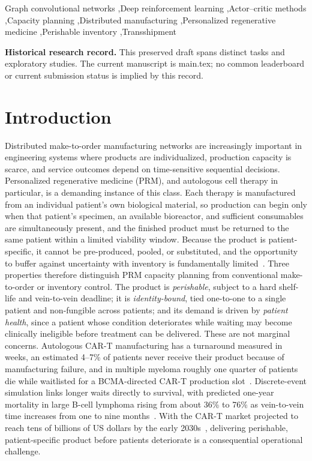 \documentclass[preprint,review,12pt]{elsarticle}
\begin{document}
\begin{frontmatter}
\begin{keyword}
Graph convolutional networks \sep Deep reinforcement learning \sep Actor--critic methods \sep Capacity planning \sep Distributed manufacturing \sep Personalized regenerative medicine \sep Perishable inventory \sep Transshipment
\end{keyword}

\end{frontmatter}
\linenumbers
\begin{center}
\textbf{Historical research record.} This preserved draft spans distinct tasks and
exploratory studies. The current manuscript is main.tex; no common leaderboard
or current submission status is implied by this record.
\end{center}


\section{Introduction}
\label{sec:introduction}

Distributed make-to-order manufacturing networks are increasingly important in engineering systems where products are individualized, production capacity is scarce, and service outcomes depend on time-sensitive sequential decisions. Personalized regenerative medicine (PRM), and autologous cell therapy in particular, is a demanding instance of this class. Each therapy is manufactured from an individual patient's own biological material, so production can begin only when that patient's specimen, an available bioreactor, and sufficient consumables are simultaneously present, and the finished product must be returned to the same patient within a limited viability window. Because the product is patient-specific, it cannot be pre-produced, pooled, or substituted, and the opportunity to buffer against uncertainty with inventory is fundamentally limited~\cite{Wang2023SimulationBased, Zheng2022HybridMBRL}. Three properties therefore distinguish PRM capacity planning from conventional make-to-order or inventory control. The product is \emph{perishable}, subject to a hard shelf-life and vein-to-vein deadline; it is \emph{identity-bound}, tied one-to-one to a single patient and non-fungible across patients; and its demand is driven by \emph{patient health}, since a patient whose condition deteriorates while waiting may become clinically ineligible before treatment can be delivered. These are not marginal concerns. Autologous CAR-T manufacturing has a turnaround measured in weeks, an estimated 4--7\% of patients never receive their product because of manufacturing failure, and in multiple myeloma roughly one quarter of patients die while waitlisted for a BCMA-directed CAR-T production slot~\cite{AyalaCeja2024CARTManufacturing}. Discrete-event simulation links longer waits directly to survival, with predicted one-year mortality in large B-cell lymphoma rising from about 36\% to 76\% as vein-to-vein time increases from one to nine months~\cite{Tully2019WaitTimes}. With the CAR-T market projected to reach tens of billions of US dollars by the early 2030s~\cite{GrandView2024CART}, delivering perishable, patient-specific product before patients deteriorate is a consequential operational challenge.
\end{document}
